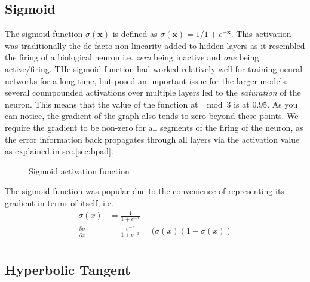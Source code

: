 \subsection*{Sigmoid}
 The sigmoid function $\sigma(\bm{x})$ is defined as $\sigma(\bm{x}) = 1/1+e^{-\bm{x}}$. This activation was traditionally the de facto non-linearity added to hidden layers as it resembled the firing of a biological neuron i.e. \textit{zero} being inactive and \textit{one} being active/firing. THe sigmoid function had worked relatively well for training neural networks for a long time, but posed an important issue for the larger models. several coumpounded activations over multiple layers led to the \textit{saturation} of the neuron. This means that the value of the function at $\mod 3 $ is at $0.95$. As you can notice, the gradient of the graph also tends to zero beyond these points. We require the gradient to be non-zero for all segments of the firing of the neuron, as the error information back propagates through all layers via the activation value as explained in sec.\ref{sec:bpad}. \\

\begin{figure}[H]
	\centering
\caption{Sigmoid activation function}
\label{fig:sigm}
\end{figure}

The sigmoid function was popular due to the convenience of representing its gradient in terms of itself, i.e.
\begin{align*}
\sigma(x) &= \frac{1}{1 + e^{-x}}\\
\frac{\partial \sigma }{\partial x} &= \frac{e^{-x}}{1+e^{-x}} = (\sigma (x)\left(1-\sigma (x)\right)\\
\end{align*}

\subsection*{Hyperbolic Tangent}

